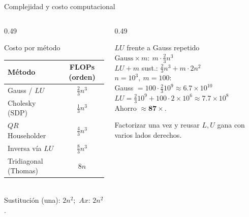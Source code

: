 \documentclass[aspectratio=169,10pt]{beamer}
\begin{document}
\begin{frame}{Complejidad y costo computacional}
\begin{columns}[T]
\begin{column}{0.49\textwidth}
\begin{cardgear}{Costo por método}{\faTable}
\centering
{\footnotesize\renewcommand{\arraystretch}{1.25}
\begin{tabular}{l|c}
Método & FLOPs (orden) \\\hline
Gauss / $LU$ & $\tfrac{2}{3}n^3$\\
Cholesky (SDP) & $\tfrac{1}{3}n^3$\\
$QR$ Householder & $\tfrac{4}{3}n^3$\\
Inversa vía $LU$ & $\tfrac{8}{3}n^3$\\
Tridiagonal (Thomas) & $8n$ \\
\end{tabular}}\\[1mm]
{\footnotesize Sustitución (una): $2n^2$;\ $Ax$: $2n^2$.}
\end{cardgear}
\end{column}
\begin{column}{0.49\textwidth}
\begin{cardidea}{$LU$ frente a Gauss repetido}{\faCalculator}
{\footnotesize $\text{Gauss}\times m:\ m\cdot\tfrac{2}{3}n^3$\\[0.8mm]
$LU+m$ sust.: $\tfrac{2}{3}n^3+m\cdot 2n^2$\\[1.6mm]
$n{=}10^3,\ m{=}100$:\\[0.6mm]
Gauss $=100\cdot\tfrac23 10^9\approx6.7\times10^{10}$\\[0.6mm]
$LU=\tfrac23 10^9+100\cdot2\times10^6\approx7.7\times10^{8}$\\[1.2mm]
Ahorro $\approx\mathbf{87\times}$.}
\end{cardidea}
\vspace{1mm}
\begin{cardnota}[\faInfoCircle]{\footnotesize Factorizar una vez y reusar $L,U$ gana con varios lados derechos.}\end{cardnota}
\end{column}
\end{columns}
\end{frame}
\end{document}
